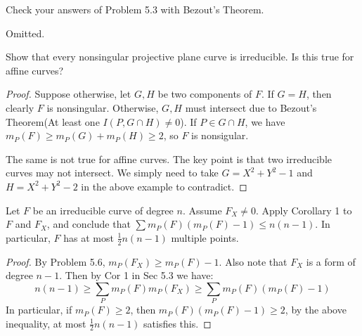 \documentclass{solution}
\begin{document}
\begin{problem}{5.20}
    Check your answers of Problem 5.3 with Bezout's Theorem.
\end{problem}

\begin{solution}
    Omitted.
\end{solution}

\begin{problem}{5.21}
    Show that every nonsingular projective plane curve is irreducible. Is this true for affine curves?
\end{problem}

\begin{proof}
    Suppose otherwise, let $G, H$ be two components of $F$. If $G = H$, then clearly $F$ is nonsingular. Otherwise, $G, H$ must intersect due to Bezout's Theorem(At least one $I(P, G \cap H) \ne 0$). If $P \in G \cap H$, we have $m_P(F) \ge m_P(G) + m_P(H) \ge 2$, so $F$ is nonsigular.

    The same is not true for affine curves. The key point is that two irreducible curves may not intersect. We simply need to take $G = X^2 + Y^2 - 1$ and $H = X^2 + Y^2 - 2$ in the above example to contradict.
\end{proof}

\begin{problem}{5.22}
    Let $F$ be an irreducible curve of degree $n$. Assume $F_X \ne 0$. Apply Corollary 1 to $F$ and $F_X$, and conclude that $\sum m_P(F)(m_P(F) - 1) \le n(n - 1)$. In particular, $F$ has at most $\frac{1}{2}n(n - 1)$ multiple points.
\end{problem}

\begin{proof}
    By Problem 5.6, $m_P(F_X) \ge m_P(F) - 1$. Also note that $F_X$ is a form of degree $n - 1$. Then by Cor 1 in Sec 5.3 we have:
    $$n(n - 1) \ge \sum\limits_{P} m_P(F)m_P(F_X) \ge \sum\limits_{P} m_P(F) (m_P(F) - 1)$$
    In particular, if $m_P(F) \ge 2$, then $m_P(F) (m_P(F) - 1) \ge 2$, by the above inequality, at most $\frac{1}{2}n(n - 1)$ satisfies this.
\end{proof}
\end{document}
